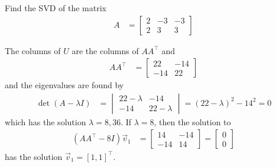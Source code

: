 \begin{example}
Find the SVD of the matrix
\begin{align*}
A & = \begin{bmatrix}
2 & -3 & -3 \\
2 & 3 & 3 
\end{bmatrix}
\end{align*}

\solution

The columns of $U$ are the columns of $AA^{\intercal}$ and 
\begin{align*}
AA^{\intercal} &  = \begin{bmatrix}
22 & -14 \\
-14 & 22 
\end{bmatrix}
\end{align*}
and the eigenvalues are found by
\begin{align*}
\det(A-\lambda I) & = \begin{vmatrix}
22-\lambda & -14 \\ -14 & 22-\lambda 
\end{vmatrix} = (22-\lambda)^2 - 14^2 = 0 
\end{align*}
which has the solution $\lambda=8,36$.  If $\lambda = 8$, then the solution to
\begin{align*}
(AA^{\intercal}-8I)\vec{v}_1 & = \begin{bmatrix}
14 & -14 \\ -14 & 14
\end{bmatrix} = \begin{bmatrix}
0 \\ 0 
\end{bmatrix}
\end{align*}
has the solution $\vec{v}_1 = [1,1]^{\intercal}$. 


\end{example}
